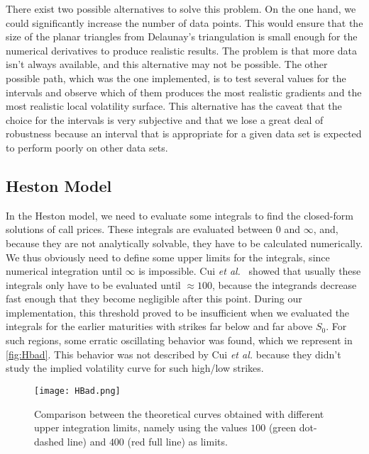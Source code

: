 There exist two possible alternatives to solve this problem.
On the one hand, we could significantly increase the number of data points. This would ensure that the size of the planar triangles from Delaunay's triangulation is small enough for the numerical derivatives to produce realistic results. The problem is that more data isn't always available, and this alternative may not be possible.
The other possible path, which was the one implemented, is to test several values for the intervals and observe which of them produces the most realistic gradients and the most realistic local volatility surface. This alternative has the caveat that the choice for the intervals is very subjective and that we lose a great deal of robustness because an interval that is appropriate for a given data set is expected to perform poorly on other data sets.

\subsection{Heston Model}
In the Heston model, we need to evaluate some integrals to find the closed-form solutions of call prices.
These integrals are evaluated between $0$ and $\infty$, and, because they are not analytically solvable, they have to be calculated numerically.
We thus obviously need to define some upper limits for the integrals, since numerical integration until $\infty$ is impossible. Cui \textit{et al.}~\citep{Cui} showed that usually these integrals only have to be evaluated until $\approx100$, because the integrands decrease fast enough that they become negligible after this point. During our implementation, this threshold proved to be insufficient when we evaluated the integrals for the earlier maturities with strikes far below and far above $S_0$. For such regions, some erratic oscillating behavior was found, which we represent in \autoref{fig:Hbad}. This behavior was not described by Cui \textit{et al.} because they didn't study the implied volatility curve for such high/low strikes.



\begin{figure}[H]
    \centering
      \texttt{[image: HBad.png]}
      \caption[Comparison between the theoretical curves obtained with different upper integration limits.]{Comparison between the theoretical curves obtained with different upper integration limits, namely using the values $100$ (green dot-dashed line) and $400$ (red full line) as limits.}\label{fig:Hbad}
    \end{figure}

